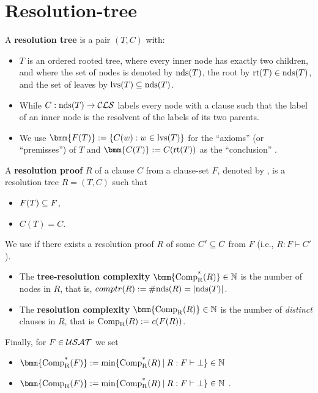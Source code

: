 \documentclass[12pt]{book}
\begin{document}
\section{Resolution-tree}
\label{sec:Resolution-tree}

\begin{defi}\label{def:restree}
  A \textbf{resolution tree} is a pair $(T,C)$ with:
  \begin{itemize}
  \item $T$ is an ordered rooted tree, where every inner node has exactly two children, and where the set of nodes is denoted 
  by $\operatorname{nds}(T)$, the root by $\operatorname{rt}(T) \in \operatorname{nds}(T)$, and the set of leaves by $\operatorname{lvs}(T) \subseteq \operatorname{nds}(T)$.
  \item While $C: \operatorname{nds}(T) \rightarrow \mathcal{CLS}$ labels every node with a clause such that the label of an inner node is the resolvent of the labels of its two parents.
  \item We use $\bmm{F(T)} := \set{C(w) : w \in \lvs(T)}$ for the ``axioms'' (or ``premisses'') of $T$ and $\bmm{C(T)} := C(\rt(T))$ as the ``conclusion'' \cite{h5}.
  \end{itemize}
\end{defi}
\begin{defi}\label{def:resproof}
  A \textbf{resolution proof} $R$ of a clause $C$ from a clause-set $F$, denoted by , is a resolution tree $R = (T,C)$ such that
  \begin{itemize}
  \item $F(T) \subseteq F$,
  \item $C(T) = C$.
  \end{itemize}
  We use  if there exists a resolution proof $R$ of some $C' \subseteq C$ from $F$ (i.e., $R: F \vdash C'$). 
  \begin{itemize}
  \item The \textbf{tree-resolution complexity} $\bmm{\comptr(R)} \in \NN$ is the number of nodes in $R$, that is, $comptr(R) := \operatorname{\#nds}(R) = \lvert \operatorname{nds}(T) \rvert$.
  \item The \textbf{resolution complexity} $\bmm{\compr(R)} \in \NN$ is the number of \emph{distinct} clauses in $R$, that is $\operatorname{\operatorname{Comp}_R}(R) := c(F(R))$.
  \end{itemize}
  Finally, for $F \in \mathcal{USAT}$ we set
  \begin{itemize}
  \item $\bmm{\comptr(F)} := \min \set{\comptr(R) \mb R : F \vdash \bot} \in \NN$
  \item $\bmm{\compr(F)} := \min \set{\comptr(R) \mb R : F \vdash \bot} \in \NN$ \cite{h5}.
  \end{itemize}
\end{defi}
\end{document}
